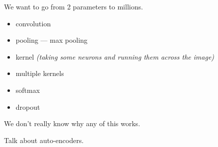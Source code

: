 
We want to go from 2 parameters to millions.

\begin{itemize}
\item convolution
\item pooling --- max pooling
\item kernel \textit{(taking some neurons and running them across the image)}
\item multiple kernels
\item softmax
\item dropout
\end{itemize}

We don't really know why any of this works.

Talk about auto-encoders.


